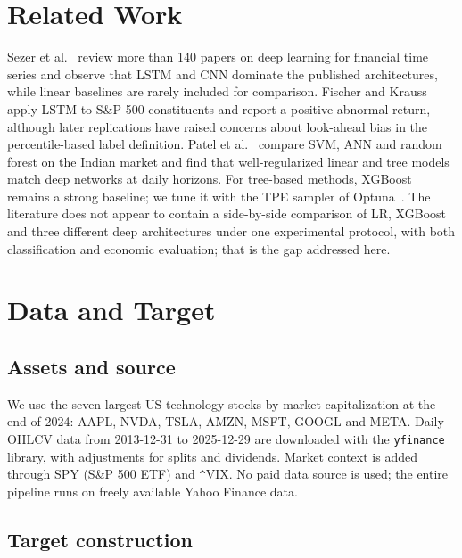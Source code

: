 \documentclass[runningheads]{llncs}
\begin{document}
\section{Related Work}
\label{sec:related}

Sezer et al.~\cite{sezer2020} review more than 140 papers on deep learning for financial time series and observe that LSTM and CNN dominate the published architectures, while linear baselines are rarely included for comparison. Fischer and Krauss~\cite{fischer2018} apply LSTM to S\&P 500 constituents and report a positive abnormal return, although later replications have raised concerns about look-ahead bias in the percentile-based label definition. Patel et al.~\cite{patel2015} compare SVM, ANN and random forest on the Indian market and find that well-regularized linear and tree models match deep networks at daily horizons. For tree-based methods, XGBoost~\cite{chen2016} remains a strong baseline; we tune it with the TPE sampler of Optuna~\cite{akiba2019}. The literature does not appear to contain a side-by-side comparison of LR, XGBoost and three different deep architectures under one experimental protocol, with both classification and economic evaluation; that is the gap addressed here.

\section{Data and Target}
\label{sec:data}

\subsection{Assets and source}

We use the seven largest US technology stocks by market capitalization at the end of 2024: AAPL, NVDA, TSLA, AMZN, MSFT, GOOGL and META. Daily OHLCV data from 2013-12-31 to 2025-12-29 are downloaded with the \texttt{yfinance} library, with adjustments for splits and dividends. Market context is added through SPY (S\&P 500 ETF) and \verb|^|VIX. No paid data source is used; the entire pipeline runs on freely available Yahoo Finance data.

\subsection{Target construction}
\end{document}
